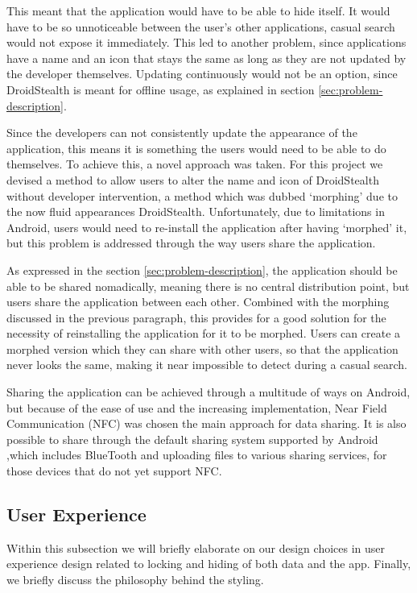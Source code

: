 This meant that the application would have to be able to hide itself.
It would have to be so unnoticeable between the user's other applications, casual search would not expose it immediately. 
This led to another problem, since applications have a name and an icon that stays the same as long as they are not updated by the developer themselves.
Updating continuously would not be an option, since DroidStealth is meant for offline usage, as explained in section \ref{sec:problem-description}. 

Since the developers can not consistently update the appearance of the application, this means it is something the users would need to be able to do themselves.
To achieve this, a novel approach was taken.
For this project we devised a method to allow users to alter the name and icon of DroidStealth without developer intervention, a method which was dubbed `morphing' due to the now fluid appearances DroidStealth.
Unfortunately, due to limitations in Android, users would need to re-install the application after having `morphed' it, but this problem is addressed through the way users share the application.

As expressed in the section \ref{sec:problem-description}, the application should be able to be shared nomadically, meaning there is no central distribution point, but users share the application between each other. 
Combined with the morphing discussed in the previous paragraph, this provides for a good solution for the necessity of reinstalling the application for it to be morphed.
Users can create a morphed version which they can share with other users, so that the application never looks the same, making it near impossible to detect during a casual search.

Sharing the application can be achieved through a multitude of ways on Android, but because of the ease of use and the increasing implementation, Near Field Communication (NFC)\cite{website:nfc-spec} was chosen the main approach for data sharing. 
It is also possible to share through the default sharing system supported by Android ,which includes BlueTooth and uploading files to various sharing services, for those devices that do not yet support NFC.

\subsection{User Experience}
\label{sec:approach-and-design:user-experience}

Within this subsection we will briefly elaborate on our design
choices in user experience design related to locking and hiding
of both data and the app. Finally, we briefly discuss the 
philosophy behind the styling. 

